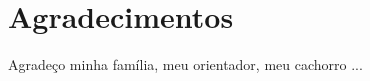 \chapter*{Agradecimentos} \thispagestyle{empty}

Agradeço minha família, meu orientador, meu cachorro ...
 
